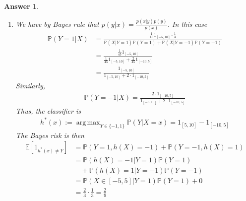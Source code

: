 \documentclass[12pt]{article}
\DeclareMathOperator*{\argmax}{arg\,max}
\theoremstyle{colon}
\newtheorem*{answer}{Answer}
\begin{document}
\begin{answer}
  \leavevmode
  \begin{enumerate}[label=\alph*)]
    \item We have by Bayes rule that $p(y|x) = \frac{p(x|y)p(y)}{p(x)}$. In this case
      \begin{align*}
        \mathbb{P}(Y = 1 | X) &= \frac{\frac{1}{15} 1_{[-5,10]} \cdot \frac{1}{3}}{\mathbb{P}(X | Y=1)\mathbb{P}(Y=1)+\mathbb{P}(X | Y=-1)\mathbb{P}(Y=-1)} \\
        &= \frac{\frac{1}{45}1_{[-5,10]}}{\frac{1}{45}1_{[-5,10]} + \frac{2}{45}1_{[-10,5]}} \\
        &= \frac{1_{[-5,10]}}{1_{[-5,10]} + 2 \cdot 1_{[-10,5]}}
      \end{align*}
      Similarly,
      \begin{gather*}
        \mathbb{P}(Y = -1 | X) = \frac{2 \cdot 1_{[-10,5]}}{1_{[-5,10]} + 2 \cdot 1_{[-10,5]}}
      \end{gather*}
      Thus, the classifier is
      \begin{gather*}
        h^*(x) := \argmax_{Y \in \{-1,1\}} \mathbb{P}(Y|X=x) = 1_{[5,10]} - 1_{[-10,5]}
      \end{gather*}
      The Bayes risk is then
      \begin{align*}
        \mathbb{E}[1_{h^*(x) \neq Y}] &= \mathbb{P}(Y = 1, h(X) = -1) + \mathbb{P}(Y = -1, h(X) = 1) \\
        &= \mathbb{P}(h(X) = -1 | Y = 1)\mathbb{P}(Y = 1)\\
        &\quad + \mathbb{P}(h(X) = 1 | Y = -1)\mathbb{P}(Y = -1) \\
        &= \mathbb{P}(X \in [-5,5] | Y = 1)\mathbb{P}(Y = 1) + 0 \\
        &= \frac{2}{3} \cdot \frac{1}{3} = \frac{2}{9}
      \end{align*}


\end{enumerate}
\end{answer}
\end{document}
